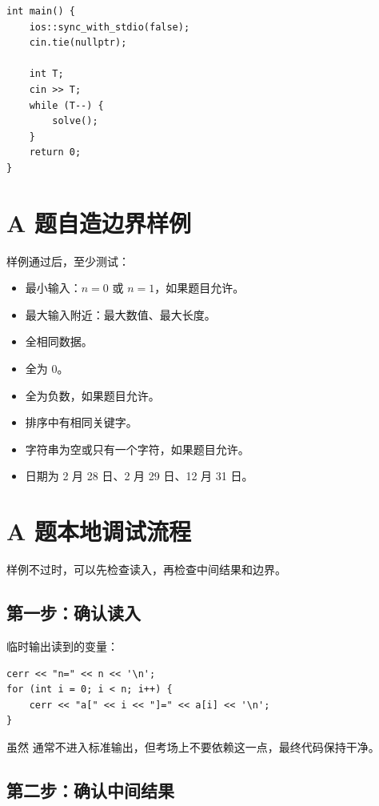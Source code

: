 \begin{lstlisting}
int main() {
    ios::sync_with_stdio(false);
    cin.tie(nullptr);

    int T;
    cin >> T;
    while (T--) {
        solve();
    }
    return 0;
}
\end{lstlisting}


\section{A 题自造边界样例}\label{sec:05-23}

样例通过后，至少测试：

\begin{itemize}
  \item 最小输入：$n=0$ 或 $n=1$，如果题目允许。
  \item 最大输入附近：最大数值、最大长度。
  \item 全相同数据。
  \item 全为 0。
  \item 全为负数，如果题目允许。
  \item 排序中有相同关键字。
  \item 字符串为空或只有一个字符，如果题目允许。
  \item 日期为 2 月 28 日、2 月 29 日、12 月 31 日。
\end{itemize}

\section{A 题本地调试流程}\label{sec:05-24}

样例不过时，可以先检查读入，再检查中间结果和边界。

\subsection{第一步：确认读入}

临时输出读到的变量：

\begin{lstlisting}
cerr << "n=" << n << '\n';
for (int i = 0; i < n; i++) {
    cerr << "a[" << i << "]=" << a[i] << '\n';
}
\end{lstlisting}

虽然  通常不进入标准输出，但考场上不要依赖这一点，最终代码保持干净。

\subsection{第二步：确认中间结果}

